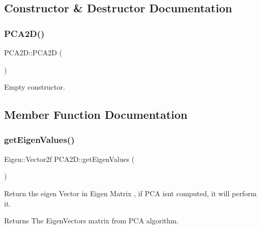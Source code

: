 \subsection{Constructor \& Destructor Documentation}
\mbox{\label{classPCA2D_a30d944a9dc80740707c532cabe91ebdf}} 
\subsubsection{\texorpdfstring{P\+C\+A2\+D()}{PCA2D()}}
{\footnotesize\ttfamily P\+C\+A2\+D\+::\+P\+C\+A2D (\begin{DoxyParamCaption}{ }\end{DoxyParamCaption})\hspace{0.3cm}{\ttfamily [inline]}}



Empty constructor. 



\subsection{Member Function Documentation}
\mbox{\label{classPCA2D_ace26902adea167c5aef9a3219ceafbd3}} 
\subsubsection{\texorpdfstring{get\+Eigen\+Values()}{getEigenValues()}}
{\footnotesize\ttfamily Eigen\+::\+Vector2f P\+C\+A2\+D\+::get\+Eigen\+Values (\begin{DoxyParamCaption}{ }\end{DoxyParamCaption})\hspace{0.3cm}{\ttfamily [inline]}}



Return the eigen Vector in Eigen Matrix , if P\+CA isn\textquotesingle{}t computed, it will perform it. 

\begin{DoxyReturn}{Returns}
The Eigen\+Vectors matrix from P\+CA algorithm. 
\end{DoxyReturn}
\mbox{\label{classPCA2D_a2243f1d03a734f7cf4f9f959f494a2e0}} 
